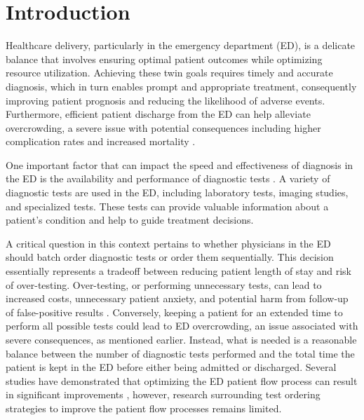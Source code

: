 \documentclass[,,nonblindrev]{informs}
\begin{document}

\maketitle


\hypertarget{sec:I}{%
\section{Introduction}\label{sec:I}}

Healthcare delivery, particularly in the emergency department (ED), is a
delicate balance that involves ensuring optimal patient outcomes while
optimizing resource utilization. Achieving these twin goals requires
timely and accurate diagnosis, which in turn enables prompt and
appropriate treatment, consequently improving patient prognosis and
reducing the likelihood of adverse events. Furthermore, efficient
patient discharge from the ED can help alleviate overcrowding, a severe
issue with potential consequences including higher complication rates
and increased mortality \citet{bernstein2009}.

One important factor that can impact the speed and effectiveness of
diagnosis in the ED is the availability and performance of diagnostic
tests \citet{naseim2015}. A variety of diagnostic tests are used in the
ED, including laboratory tests, imaging studies, and specialized tests.
These tests can provide valuable information about a patient's condition
and help to guide treatment decisions.

A critical question in this context pertains to whether physicians in
the ED should batch order diagnostic tests or order them sequentially.
This decision essentially represents a tradeoff between reducing patient
length of stay and risk of over-testing. Over-testing, or performing
unnecessary tests, can lead to increased costs, unnecessary patient
anxiety, and potential harm from follow-up of false-positive results
\citet{koch2018}. Conversely, keeping a patient for an extended time to
perform all possible tests could lead to ED overcrowding, an issue
associated with severe consequences, as mentioned earlier. Instead, what
is needed is a reasonable balance between the number of diagnostic tests
performed and the total time the patient is kept in the ED before either
being admitted or discharged. Several studies have demonstrated that
optimizing the ED patient flow process can result in significant
improvements \citet{saghafian2015}, however, research surrounding test
ordering strategies to improve the patient flow processes remains
limited.
\end{document}

